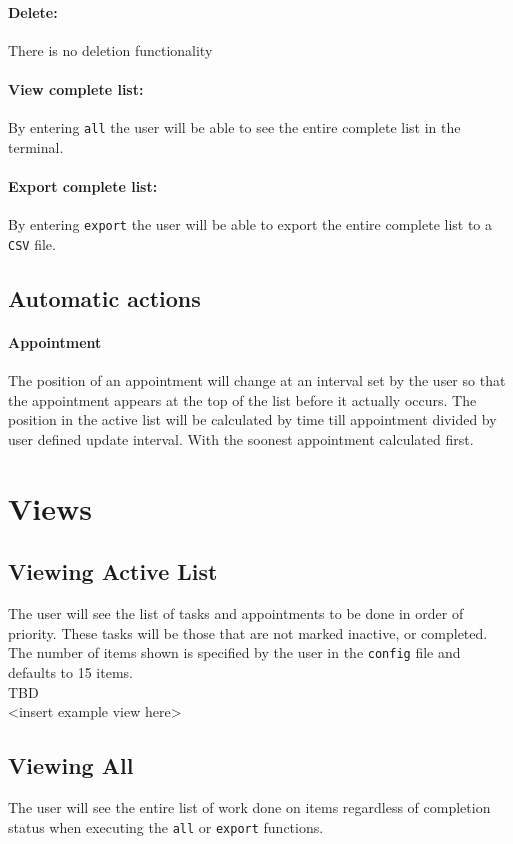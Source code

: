 \documentclass[12pt]{article}
\newcommand{\e}[1] {{\tt #1}}
\begin{document}
\paragraph{Delete:} \label{sec:Delete} There is no deletion functionality
\paragraph{View complete list:} \label{sec:View complete list} By entering \e{all} the user will be able to see the entire complete list in the terminal.
\paragraph{Export complete list:} \label{sec:Export complete list} By entering \e{export} the user will be able to export the entire complete list to a \e{CSV} file.
\subsection{Automatic actions}
\setcounter{paragraph}{0}
\setcounter{subsubsection}{0}
\paragraph{Appointment} \label{sec:Auto appointments} The position of an appointment will change at an interval set by the user so that the appointment appears at the top of the list before it actually occurs. The position in the active list will be calculated by time till appointment divided by user defined update interval. With the soonest appointment calculated first.


\section{Views}
\subsection{Viewing Active List}
The user will see the list of tasks and appointments to be done in order of priority. These tasks will be those that are not marked inactive, or completed. The number of items shown is specified by the user in the \e{config} file and defaults to 15 items. 
\\
TBD\\
<insert example view here>

\subsection{Viewing All} \label{sec:View all}
The user will see the entire list of work done on items regardless of completion status when executing the \e{all} or \e{export} functions.
\end{document}
